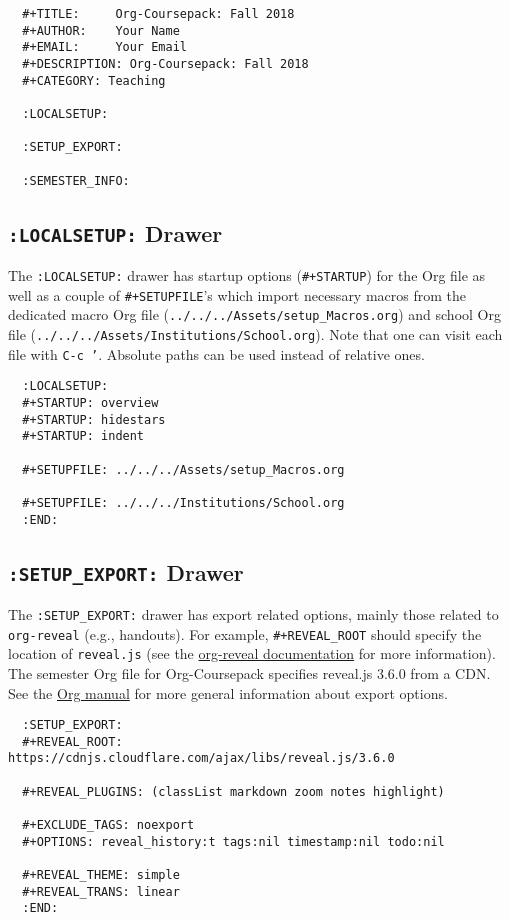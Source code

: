 \documentclass[10pt,article]{article}
\begin{document}
\begin{verbatim}
  #+TITLE:     Org-Coursepack: Fall 2018
  #+AUTHOR:    Your Name
  #+EMAIL:     Your Email
  #+DESCRIPTION: Org-Coursepack: Fall 2018
  #+CATEGORY: Teaching
  
  :LOCALSETUP:
  
  :SETUP_EXPORT:
  
  :SEMESTER_INFO:
\end{verbatim}
\subsection{\texttt{:LOCALSETUP:} Drawer}
\label{sec:org424743f}
The \texttt{:LOCALSETUP:} drawer has startup options (\texttt{\#+STARTUP}) for the
Org file as well as a couple of \texttt{\#+SETUPFILE}'s which import necessary
macros from the dedicated macro Org file
(\texttt{../../../Assets/setup\_Macros.org}) and school Org file
(\texttt{../../../Assets/Institutions/School.org}). Note that one can visit each
file with \texttt{C-c '}. Absolute paths can be used instead of relative
ones.

\begin{verbatim}
  :LOCALSETUP:
  #+STARTUP: overview
  #+STARTUP: hidestars
  #+STARTUP: indent
  
  #+SETUPFILE: ../../../Assets/setup_Macros.org
  
  #+SETUPFILE: ../../../Institutions/School.org
  :END:
\end{verbatim}
\subsection{\texttt{:SETUP\_EXPORT:} Drawer}
\label{sec:orgcece9f5}
The \texttt{:SETUP\_EXPORT:} drawer has export related options, mainly those
related to \texttt{org-reveal} (e.g., handouts). For example, \texttt{\#+REVEAL\_ROOT}
should specify the location of \texttt{reveal.js} (see the \href{https://github.com/yjwen/org-reveal/}{org-reveal
documentation} for more information). The semester Org file for
Org-Coursepack specifies reveal.js 3.6.0 from a CDN. See the \href{https://orgmode.org/manual/Export-settings.html}{Org manual}
for more general information about export options.

{\small
\begin{verbatim}
  :SETUP_EXPORT:
  #+REVEAL_ROOT: https://cdnjs.cloudflare.com/ajax/libs/reveal.js/3.6.0
  
  #+REVEAL_PLUGINS: (classList markdown zoom notes highlight)
  
  #+EXCLUDE_TAGS: noexport
  #+OPTIONS: reveal_history:t tags:nil timestamp:nil todo:nil
  
  #+REVEAL_THEME: simple
  #+REVEAL_TRANS: linear
  :END:
\end{verbatim}
}
\end{document}
